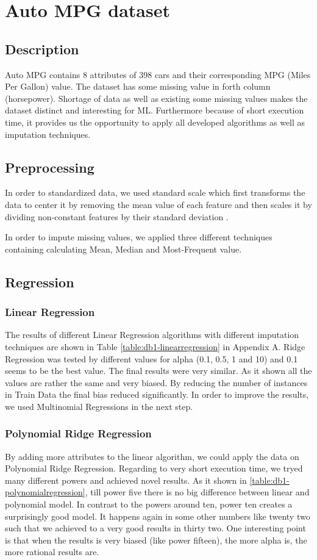 \section{Auto MPG dataset}
\subsection{Description}
Auto MPG contains 8 attributes of 398 cars  and their corresponding MPG (Miles Per Gallon) value. The dataset has some missing value in forth column (horsepower). Shortage of data as well as existing some missing values makes the dataset distinct and interesting for ML. Furthermore because of short execution time, it provides us the opportunity to apply all developed algorithms as well as imputation techniques.

\subsection{Preprocessing}
In order to standardized data, we used standard scale which first transforms the data to center it by removing the mean value of each feature and then scales it by dividing non-constant features by their standard deviation \cite{scikitstandardization}.

In order to impute missing values, we applied three different techniques containing calculating Mean, Median and Most-Frequent value.

\subsection{Regression}
\subsubsection{Linear Regression}
The results of different Linear Regression algorithms with different imputation techniques are shown in Table \ref{table:db1-linearregression} in Appendix A. Ridge Regression was tested by different values for alpha (0.1, 0.5, 1 and 10) and 0.1 seems to be the best value. The final results were very similar. As it shown all the values are rather the same and very biased. By reducing the number of instances in Train Data the final bias reduced significantly. In order to improve the results, we used Multinomial Regressions in the next step.

\subsubsection{Polynomial Ridge Regression}
By adding more attributes to the linear algorithm, we could apply the data on Polynomial Ridge Regression. Regarding to very short execution time, we tryed many different powers and achieved novel results. As it shown in \ref{table:db1-polynomialregression}, till power five there is no big difference between linear and polynomial model. In contrast to the powers around ten, power ten creates a surprisingly good model. It happens again in some other numbers like twenty two such that we achieved to a very good results in thirty two. One interesting point is that when the results is very biased (like power fifteen), the more alpha is, the more rational results are.


